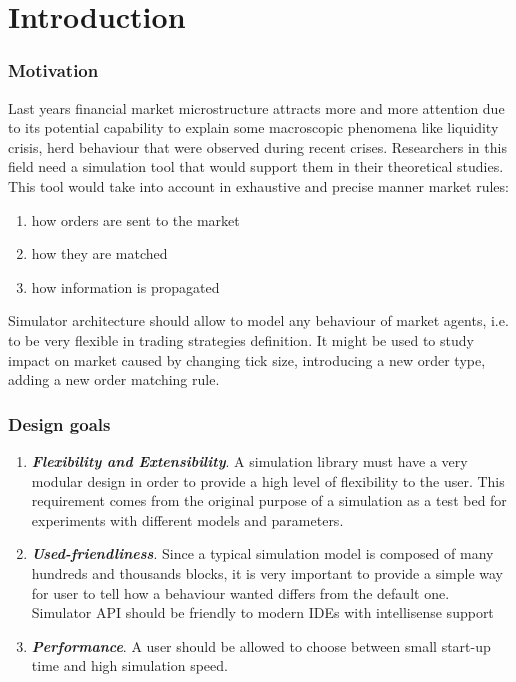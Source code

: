 \documentclass{beamer}
\begin{document}
\section{Introduction}
\begin{frame}
\frametitle{Motivation}
Last years financial market microstructure attracts more and more attention due to its potential capability to explain some macroscopic phenomena like liquidity crisis, herd behaviour that were observed during recent crises. Researchers in this field need a simulation tool that would support them in their theoretical studies. This tool would take into account in exhaustive and precise manner market rules:
\begin{enumerate}
\item how orders are sent to the market
\item how they are matched
\item how information is propagated 
\end{enumerate}
Simulator architecture should allow to model any behaviour of market agents, i.e. to be very flexible in trading strategies definition. It might be used to study impact on market caused by changing tick size, introducing a new order type, adding a new order matching rule.
\end{frame}
\begin{frame}
\frametitle{Design goals}
\begin{enumerate}
  \item \textbf{\textit{Flexibility and Extensibility}}. A simulation library must have a very modular design in order to provide a high level of flexibility to the user. This requirement comes from the original purpose of a simulation as a test bed for experiments with different models and parameters.
  \item \textbf{\textit{Used-friendliness}}. Since a typical simulation model is composed of many hundreds and thousands blocks, it is very important to provide a simple way for user to tell how a behaviour wanted differs from the default one. Simulator API should be friendly to modern IDEs with intellisense support
  \item \textbf{\textit{Performance}}. A user should be allowed to choose between small start-up time and high simulation speed.
\end{enumerate}
\end{frame}
\end{document}
